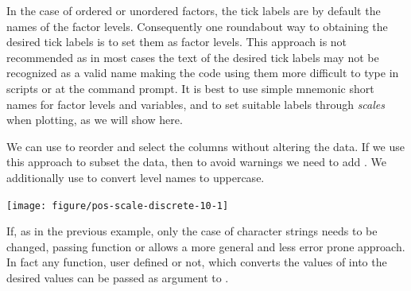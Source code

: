 \documentclass[krantz2]{krantz}\usepackage{knitr}%
\begin{document}
In the case of ordered or unordered factors, the tick labels are by default the names of the factor levels. Consequently one roundabout way to obtaining the desired tick labels is to set them as factor levels. This approach is not recommended as in most cases the text of the desired tick labels may not be recognized as a valid name making the code using them more difficult to type in scripts or at the command prompt. It is best to use simple mnemonic short names for factor levels and variables, and to set suitable labels through \emph{scales} when plotting, as we will show here.

We can use  to reorder and select the columns without altering the data. If we use this approach to subset the data, then to avoid warnings we need to add . We additionally use  to convert level names to uppercase.

\begin{knitrout}\footnotesize
{}\color{fgcolor}\begin{kframe}
\begin{alltt}
  \hlopt{+}
  \hlstd{(} \hlstd{=} \hlstd{,}    \hlstd{=} \hlstd{)} \hlopt{+}
  \hlstd{(} \hlstd{=} \hlstd{(}\hlstd{,} \hlstd{,} \hlstd{),}
                    \hlstd{=} \hlstd{(}\hlstd{,} \hlstd{,} \hlstd{))}
\end{alltt}
\end{kframe}

{\centering \texttt{[image: figure/pos-scale-discrete-10-1]} 

}



\end{knitrout}

If, as in the previous example, only the case of character strings needs to be changed, passing function  or  allows a more general and less error prone approach. In fact any function, user defined or not, which converts the values of  into the desired values can be passed as argument to .
\end{document}

